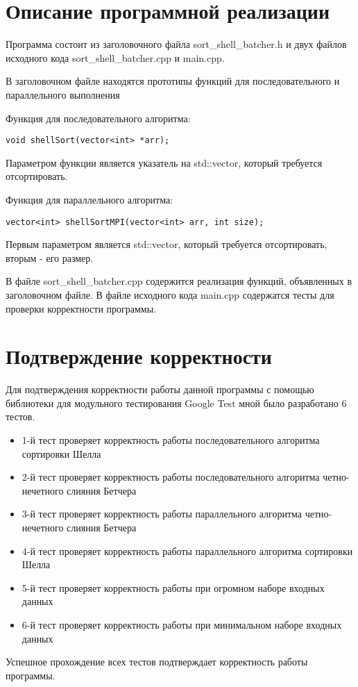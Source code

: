 \documentclass{report}
\begin{document}
\newpage

\section*{Описание программной реализации}
Программа состоит из заголовочного файла sort\_shell\_batcher.h и двух файлов исходного кода sort\_shell\_batcher.cpp и main.cpp.
\par В заголовочном файле находятся прототипы функций для последовательного и параллельного выполнения
\par Функция для последовательного алгоритма:
\begin{lstlisting}
void shellSort(vector<int> *arr);
\end{lstlisting}
Параметром функции является указатель на std::vector, который требуется отсортировать.
\par Функция для параллельного алгоритма:
\begin{lstlisting}
vector<int> shellSortMPI(vector<int> arr, int size);
\end{lstlisting}
Первым параметром является std::vector, который требуется отсортировать, вторым - его размер.
\par В файле sort\_shell\_batcher.cpp содержится реализация функций, объявленных в заголовочном файле. В файле исходного кода main.cpp содержатся тесты для проверки корректности программы.
\newpage

\section*{Подтверждение корректности}
Для подтверждения корректности работы данной программы с помощью библиотеки для модульного тестирования  Google Test мной было разработано 6 тестов. 
\begin{itemize}
    \item 1-й тест проверяет корректность работы последовательного алгоритма сортировки Шелла
    \item 2-й тест проверяет корректность работы последовательного алгоритма четно-нечетного слияния Бетчера
    \item 3-й тест проверяет корректность работы параллельного алгоритма четно-нечетного слияния Бетчера
    \item 4-й тест проверяет корректность работы параллельного алгоритма сортировки Шелла
    \item 5-й тест проверяет корректность работы при огромном наборе входных данных
    \item 6-й тест проверяет корректность работы при минимальном наборе входных данных
\end{itemize}
\par Успешное прохождение всех тестов подтверждает корректность работы программы.
\newpage
\end{document}
